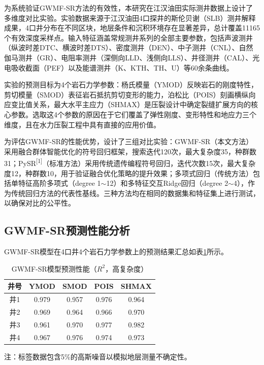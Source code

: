 \documentclass[a4paper,12pt]{ctexart}
\begin{document}
为系统验证GWMF-SR方法的有效性，本研究在江汉油田实际测井数据上设计了多维度对比实验。实验数据来源于江汉油田4口探井的斯伦贝谢（SLB）测井解释成果，4口井分布在不同区块，地层条件和沉积环境存在显著差异，总计覆盖11165个有效深度采样点。输入特征涵盖常规测井系列的全部主要参数，包括声波测井（纵波时差DTC、横波时差DTS）、密度测井（DEN）、中子测井（CNL）、自然伽马测井（GR）、电阻率测井（深侧向LLD、浅侧向LLS）、井径测井（CAL）、光电吸收截面（PEF）以及能谱测井（K、KTH、TH、U）等60余条曲线。

实验的预测目标为4个岩石力学参数：杨氏模量（YMOD）反映岩石的刚度特性，剪切模量（SMOD）表征岩石抵抗剪切变形的能力，泊松比（POIS）刻画横纵向应变比值关系，最大水平主应力（SHMAX）是压裂设计中确定裂缝扩展方向的核心参数。选取这4个参数的原因在于它们覆盖了弹性刚度、变形特性和地应力三个维度，且在水力压裂工程中具有直接的应用价值。

为评估GWMF-SR的性能优势，设计了三组对比实验：GWMF-SR（本文方法）采用融合群体智能优化的符号回归框架，搜索迭代120次，最大复杂度35，种群数31；PySR\textsuperscript{[1]}（标准方法）采用传统遗传编程符号回归，迭代次数15次，最大复杂度12，种群数10，用于验证融合优化策略的提升效果；多项式回归（传统方法）包括单特征高阶多项式（degree 1$\sim$12）和多特征交互Ridge回归（degree 2$\sim$4），作为传统回归方法的代表性基线。三种方法均在相同的数据集和特征集上进行测试，以确保对比的公平性。

\subsection{GWMF-SR预测性能分析}

GWMF-SR模型在4口井4个岩石力学参数上的预测结果汇总如表\ref{tab:r2}所示。

\begin{table}[htbp]
  \centering
  \caption{GWMF-SR模型预测性能（$R^2$，高复杂度）}
  \label{tab:r2}
  \begin{tabular}{ccccc}
    \toprule
    井号 & YMOD & SMOD & POIS & SHMAX \\
    \midrule
    井1 & 0.979 & 0.957 & 0.976 & 0.964 \\
    井2 & 0.969 & 0.964 & 0.966 & 0.970 \\
    井3 & 0.961 & 0.970 & 0.977 & 0.982 \\
    井4 & 0.967 & 0.976 & 0.974 & 0.973 \\
    \bottomrule
  \end{tabular}
  \begin{flushleft}
    \small 注：标签数据包含5\%的高斯噪音以模拟地层测量不确定性。
  \end{flushleft}
\end{table}
\end{document}
